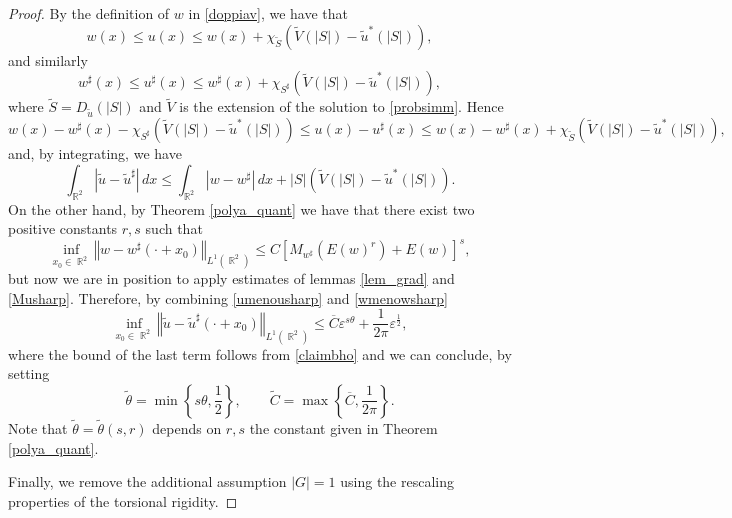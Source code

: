 \documentclass[oneside,a4paper,11pt,notitlepage]{article}
\newcommand{\abs}[1]{{\left|#1\right|}}
\newcommand{\norma}[1]{{\left\Vert#1\right\Vert}}
\theoremstyle{definition}
\theoremstyle{plain}
\theoremstyle{definition}
\DeclareMathOperator{\R}{\mathbb{R}}
\begin{document}
\begin{proof}
  By the definition of  $w$ in \eqref{doppiav}, we have that 
    \begin{equation*}
        w(x)\leq u(x)\leq w(x)+\chi_{\tilde S}(\tilde V(\abs{S})-\tilde u^*(\abs{S})),
    \end{equation*}
    and similarly
    \begin{equation*}
        w^\sharp(x)\leq u^\sharp(x)\leq w^\sharp(x)+\chi_{ S^\sharp}(\tilde V(\abs{S})-\tilde u^*(\abs{S})),
    \end{equation*}
    where $\tilde S=D_{\tilde u}(\abs{S})$ and $\tilde V$ is the extension of the solution to \eqref{probsimm}. Hence
    \begin{equation*}
       w(x)- w^\sharp(x)-\chi_{ S^\sharp}(\tilde V(\abs{S})-\tilde u^*(\abs{S}))\leq u(x)-u^\sharp(x)\leq     w(x)- w^\sharp(x)+\chi_{ \tilde S}(\tilde V(\abs{S})-\tilde u^*(\abs{S})),
    \end{equation*}
    and, by integrating, we have
    \begin{equation}\label{umenousharp}
        \int_{\R^2}\abs{\tilde u-\tilde u^\sharp}\,dx\leq \int_{\R^2}\abs{w-w^\sharp}\,dx+\abs{S}(\tilde V(\abs{S})-\tilde u^*(\abs{S})).
    \end{equation}
    On the other hand, by Theorem \ref{polya_quant} we have that there exist two positive constants $r,s$ such that
    \begin{equation}\label{wmenowsharp}
        \inf_{x_0\in\R^2}\norma{w-w^\sharp(\cdot+x_0)}_{L^1(\R^2)}\leq C\left[M_{w^\sharp}(E(w)^r)+E(w)\right]^s,
    \end{equation}
    but now we are in position to apply estimates of lemmas \ref{lem_grad} and \ref{Musharp}. Therefore, by combining \eqref{umenousharp} and \eqref{wmenowsharp}
    \begin{equation*}
        \inf_{x_0\in\R^2}\norma{\tilde u-\tilde u^\sharp(\cdot+x_0)}_{L^1(\R^2)}\leq\overline C\varepsilon^{s\theta}+\frac{1}{2\pi}\varepsilon^\frac{1}{2},
    \end{equation*}
    where the bound of the last term follows from \eqref{claimbho} and we can conclude, by setting
    \begin{equation*}
        \tilde \theta=\min\left\{s\theta,\frac{1}{2}\right\},\qquad \tilde C=\max\left\{\overline C,\frac{1}{2\pi}\right\}.
    \end{equation*}
    Note that $\tilde \theta=\tilde \theta(s,r)$ depends on $r,s$ the constant given in Theorem \ref{polya_quant}.
    
    Finally, we remove the additional assumption $\abs{G}=1$ using the rescaling properties of the torsional rigidity.
\end{proof}
\end{document}
